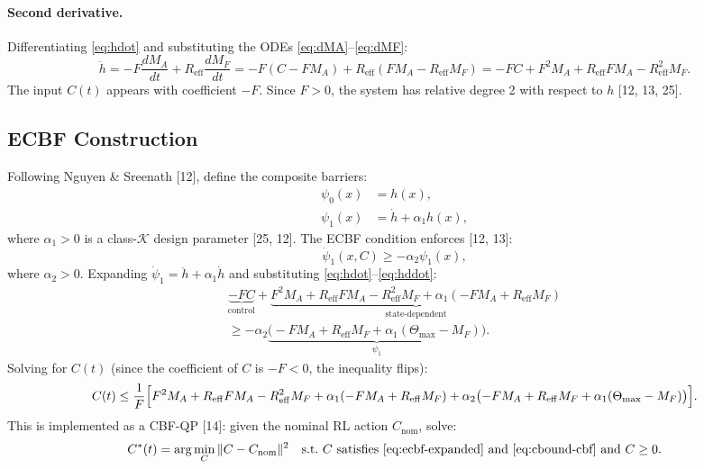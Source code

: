 \documentclass[11pt,a4paper]{article}
\begin{document}
\paragraph{Second derivative.} Differentiating \eqref{eq:hdot} and substituting the ODEs \eqref{eq:dMA}--\eqref{eq:dMF}:
\begin{equation}\label{eq:hddot}
\ddot h = -F \frac{dM_A}{dt} + R_{\mathrm{eff}} \frac{dM_F}{dt}
= -F(C - F M_A) + R_{\mathrm{eff}}(F M_A - R_{\mathrm{eff}} M_F)
= -FC + F^2 M_A + R_{\mathrm{eff}} F M_A - R_{\mathrm{eff}}^2 M_F.
\end{equation}
The input $C(t)$ appears with coefficient $-F$. Since $F > 0$, the
system has relative degree 2 with respect to $h$ [12, 13, 25].

\subsection{ECBF Construction}\label{sec:ecbf-construction}

Following Nguyen \& Sreenath [12], define the composite barriers:
\begin{align}
\psi_0(x) &= h(x), \label{eq:psi0}\\
\psi_1(x) &= \dot h + \alpha_1 h(x), \label{eq:psi1}
\end{align}
where $\alpha_1 > 0$ is a class-$\mathcal{K}$ design parameter [25, 12]. The
ECBF condition enforces [12, 13]:
\begin{equation}\label{eq:ecbf-condition}
\dot\psi_1(x, C) \geq -\alpha_2 \psi_1(x),
\end{equation}
where $\alpha_2 > 0$. Expanding $\dot\psi_1 = \ddot h + \alpha_1 \dot
h$ and substituting \eqref{eq:hdot}--\eqref{eq:hddot}:
\begin{multline}\label{eq:ecbf-expanded}
\underbrace{-FC}_{\text{control}} + \underbrace{F^2 M_A + R_{\mathrm{eff}} F M_A - R_{\mathrm{eff}}^2 M_F + \alpha_1(-F M_A + R_{\mathrm{eff}} M_F)}_{\text{state-dependent}} \\
\geq -\alpha_2 \underbrace{\bigl(-F M_A + R_{\mathrm{eff}} M_F + \alpha_1 (\Theta_{\max} - M_F)\bigr)}_{\psi_1}.
\end{multline}
Solving for $C(t)$ (since the coefficient of $C$ is $-F < 0$, the inequality flips):
\begin{equation}\label{eq:cbound-ecbf}
C(t) \leq \frac{1}{F}\Bigl[F^2 M_A + R_{\mathrm{eff}} F M_A - R_{\mathrm{eff}}^2 M_F + \alpha_1(-F M_A + R_{\mathrm{eff}} M_F) + \alpha_2\bigl(-F M_A + R_{\mathrm{eff}} M_F + \alpha_1(\Theta_{\max} - M_F)\bigr)\Bigr].
\end{equation}
This is implemented as a CBF-QP [14]: given the nominal RL action $C_{\mathrm{nom}}$, solve:
\begin{equation}\label{eq:qp}
C^*(t) = \arg\min_{C} \|C - C_{\mathrm{nom}}\|^2 \quad \text{s.t.\ $C$ satisfies \eqref{eq:ecbf-expanded} and \eqref{eq:cbound-cbf} and $C \geq 0$}.
\end{equation}
\end{document}
